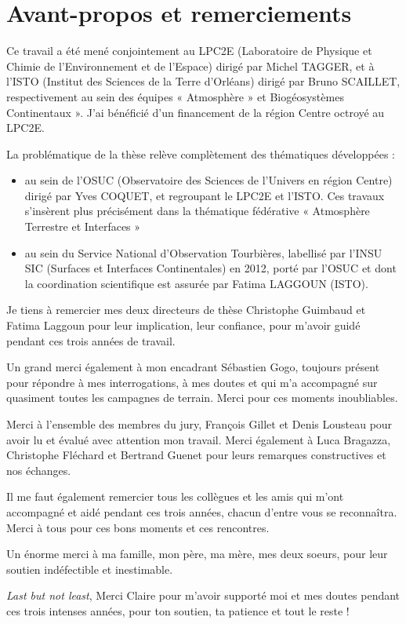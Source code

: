 
\chapter{Avant-propos et remerciements}

Ce travail a été mené conjointement au LPC2E (Laboratoire de Physique et Chimie de l’Environnement et de l’Espace) dirigé par Michel TAGGER, et à l'ISTO (Institut des Sciences de la Terre d’Orléans) dirigé par Bruno SCAILLET, respectivement au sein des équipes « Atmosphère » et Biogéosystèmes Continentaux ». J'ai bénéficié d’un financement de la région Centre octroyé au LPC2E. 

La problématique de la thèse relève complètement des thématiques développées :
\begin{itemize}
\item au sein de l’OSUC (Observatoire des Sciences de l’Univers en région Centre) dirigé par Yves COQUET, et regroupant le LPC2E et l’ISTO. Ces travaux s’insèrent plus précisément dans la thématique fédérative « Atmosphère Terrestre et Interfaces »
\item au sein du Service National d’Observation Tourbières, labellisé par l’INSU SIC (Surfaces et Interfaces Continentales) en 2012, porté par l’OSUC et dont la coordination scientifique est assurée par Fatima LAGGOUN (ISTO).
\end{itemize}

\vspace*{1cm}

Je tiens à remercier mes deux directeurs de thèse Christophe Guimbaud et Fatima Laggoun pour leur implication, leur confiance, pour m'avoir guidé pendant ces trois années de travail.

Un grand merci également à mon encadrant Sébastien Gogo, toujours présent pour répondre à mes interrogations, à mes doutes et qui m'a accompagné sur quasiment toutes les campagnes de terrain. Merci pour ces moments inoubliables.

Merci à l'ensemble des membres du jury, François Gillet et Denis Lousteau pour avoir lu et évalué avec attention mon travail.
Merci également à Luca Bragazza, Christophe Fléchard et Bertrand Guenet pour leurs remarques constructives et nos échanges.

Il me faut également remercier tous les collègues et les amis qui m'ont accompagné et aidé pendant ces trois années, chacun d'entre vous se reconnaîtra.
Merci à tous pour ces bons moments et ces rencontres.

Un énorme merci à ma famille, mon père, ma mère, mes deux soeurs, pour leur soutien indéfectible et inestimable. 

\textit{Last but not least}, Merci Claire pour m'avoir supporté moi et mes doutes pendant ces trois intenses années, pour ton soutien, ta patience et tout le reste !
